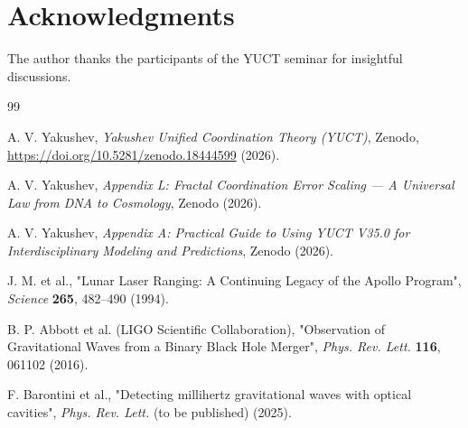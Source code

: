 \documentclass[12pt,a4paper]{article}
\begin{document}
	\section*{Acknowledgments}
	
	The author thanks the participants of the YUCT seminar for insightful discussions.
	
	\begin{thebibliography}{99}
		
		A. V. Yakushev, \emph{Yakushev Unified Coordination Theory (YUCT)}, Zenodo, \url{https://doi.org/10.5281/zenodo.18444599} (2026).
		
		A. V. Yakushev, \emph{Appendix L: Fractal Coordination Error Scaling — A Universal Law from DNA to Cosmology}, Zenodo (2026).
		
		A. V. Yakushev, \emph{Appendix A: Practical Guide to Using YUCT V35.0 for Interdisciplinary Modeling and Predictions}, Zenodo (2026).
		
		J. M. et al., "Lunar Laser Ranging: A Continuing Legacy of the Apollo Program", \emph{Science} \textbf{265}, 482–490 (1994).
		
		B. P. Abbott et al. (LIGO Scientific Collaboration), "Observation of Gravitational Waves from a Binary Black Hole Merger", \emph{Phys. Rev. Lett.} \textbf{116}, 061102 (2016).
		
		F. Barontini et al., "Detecting millihertz gravitational waves with optical cavities", \emph{Phys. Rev. Lett.} (to be published) (2025).
		
	\end{thebibliography}
	
\end{document}
